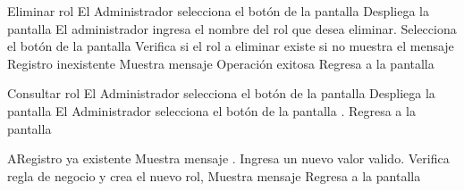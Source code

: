 	\begin{UCtrayectoria}{Eliminar rol}
		\UCpaso[\UCactor] El Administrador selecciona el botón  de la pantalla 
		\UCpaso[\UCsist] Despliega la pantalla 
		\UCpaso[\UCactor] El administrador ingresa el nombre del rol que desea eliminar.
		\UCpaso[\UCactor] Selecciona el botón  de la pantalla 
		\UCpaso[\UCsist]Verifica si el rol a eliminar existe si no muestra el mensaje 
		Registro inexistente
		\UCpaso[\UCsist] Muestra mensaje %
		Operación exitosa
		\UCpaso[\UCsist] Regresa a la pantalla 
	\end{UCtrayectoria}
	\begin{UCtrayectoria}{Consultar rol}
		\UCpaso[\UCactor] El Administrador selecciona el botón  de la pantalla 
		\UCpaso[\UCsist] Despliega la pantalla 
		\UCpaso[\UCactor]  El Administrador selecciona el botón  de la pantalla .
		\UCpaso[\UCsist] Regresa a la pantalla 
	\end{UCtrayectoria}
		\begin{UCtrayectoriaA}{A}{Registro ya existente}
			\UCpaso[\UCsist] Muestra mensaje .
			\UCpaso[\UCactor] Ingresa un nuevo valor valido.
			\UCpaso[\UCsist] Verifica regla de negocio  y crea el nuevo rol, 
		\UCpaso[\UCsist] Muestra mensaje 
		\UCpaso[\UCsist] Regresa a la pantalla 
		\end{UCtrayectoriaA}
		
